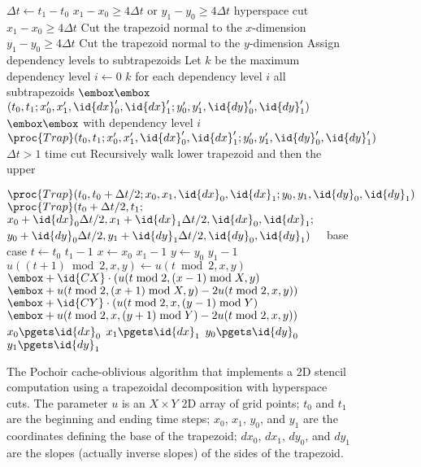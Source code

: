 \begin{figure}
\small
\begin{codebox}
\li $\Delta t \gets t_1 - t_0$
\li \If $x_1 - x_0 \geq 4\Delta t$ or $y_1 - y_0 \geq 4\Delta t$ 
         \Comment hyperspace cut \label{li:canCut}
\li      \Then \If $x_1 - x_0 \geq 4\Delta t$ \label{li:cutX}
\li       	        \Then Cut the trapezoid normal to the $x$-dimension
     		    \End
\li            \If $y_1 - y_0 \geq 4\Delta t$ 
\li                 \Then Cut the trapezoid normal to the $y$-dimension
               \End \label{li:cutY}
\li            Assign dependency levels to subtrapezoids
\li            Let $k$ be the maximum dependency level
\li  \For $i \gets 0$ \To $k$ \label{li:parallelSpawnBegin}
       \Comment for each dependency level $i$
\li 	\Do \Parfor all subtrapezoids 
\zi $\embox\embox$ $(t_0, t_1; x'_0, x'_1, \id{dx}'_0, \id{dx}'_1; y'_0, y'_1, \id{dy}'_0, \id{dy}'_1)$ 
\zi  $\embox\embox$ with dependency level $i$
\li    \Do    $\proc{Trap}(t_0, t_1; x'_0, x'_1, \id{dx}'_0, \id{dx}'_1; y'_0, y'_1, \id{dy}'_0, \id{dy}'_1)$ \label{li:parallelSpawnEnd}
    \End    \End 
\li \ElseIf $\Delta t > 1$ \Comment time cut \label{li:simTimeCutBegin}
\li \Then \Comment Recursively walk lower trapezoid and then the upper

\li  $\proc{Trap}(t_0, t_0 + \Delta t/2; 
                 x_0, x_1, \id{dx}_0, \id{dx}_1;
                 y_0, y_1, \id{dy}_0, \id{dy}_1)$
\li  $\proc{Trap}(t_0 + \Delta t/2, t_1;$
                 $x_0 + \id{dx}_0 \Delta t/2, x_1 + \id{dx}_1 \Delta t/2, \id{dx}_0, \id{dx}_1;$ 
\zi              $y_0 + \id{dy}_0 \Delta t/2, y_1 + \id{dy}_1 \Delta t/2, \id{dy}_0, \id{dy}_1)$ \label{li:simTimeCutEnd}
\li \Else \ \ \Comment base case \label{li:simBaseCaseBegin}
\li 	\For $t \gets t_0$ \To $t_1-1$ 
\li          \Do \For $x \gets x_0$ \To $x_1-1$
\li             \Do \For $y \gets y_0$ \To $y_1-1$
\li                 \Do $u((t+1)\bmod 2,x,y) \gets u(t\bmod 2,x,y) $
\zi  $\embox + \id{CX}\cdot ( u(t\bmod 2, (x-1)\bmod X, y) $
\zi  $\embox + u(t\bmod 2, (x+1)\bmod X, y) -2 u (t\bmod 2, x, y)) $
\zi  $\embox + \id{CY}\cdot ( u(t\bmod 2, x, (y-1)\bmod Y) $
\zi  $\embox + u(t\bmod 2, x, (y+1)\bmod Y) -2u(t\bmod 2, x, y) )$
	\End
	\End
	\End
\li \> $x_0 \pgets \id{dx}_0$
\li \> $x_1 \pgets \id{dx}_1$
\li \> $y_0 \pgets \id{dy}_0$
\li \> $y_1 \pgets \id{dy}_1$ \label{li:simBaseCaseEnd}
\End 
\end{codebox}

\caption{%
  The Pochoir cache-oblivious algorithm that implements a 2D stencil
  computation using a trapezoidal decomposition with hyperspace cuts.
  The parameter $u$ is an $X\times Y$ 2D array of grid points; $t_0$
  and $t_1$ are the beginning and ending time steps; $x_0$, $x_1$,
  $y_0$, and $y_1$ are the coordinates defining the base of the
  trapezoid; $dx_0$, $dx_1$, $dy_0$, and $dy_1$ are the slopes
  (actually inverse slopes) of the sides of the trapezoid.}
\label{fig:trap-code}
\end{figure}

